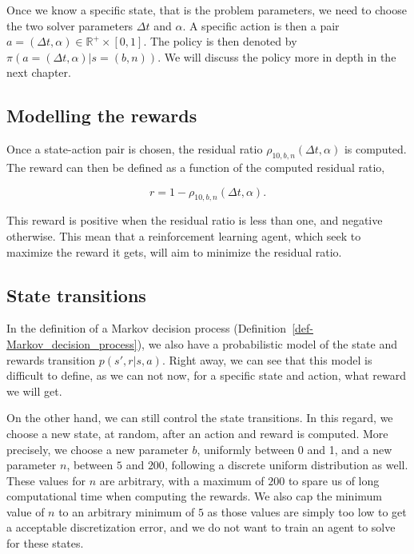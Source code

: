 \documentclass[
  letterpaper,
]{report}
\theoremstyle{definition}
\theoremstyle{plain}
\theoremstyle{definition}
\theoremstyle{remark}
\begin{document}
Once we know a specific state, that is the problem parameters, we need
to choose the two solver parameters \(\Delta t\) and \(\alpha\). A
specific action is then a pair
\(a = (\Delta t, \alpha) \in \mathbb{R^+}\times [0,1]\). The policy is
then denoted by \(\pi(a = (\Delta t, \alpha) |s = (b,n))\). We will
discuss the policy more in depth in the next chapter.

\subsection*{Modelling the rewards}\label{modelling-the-rewards}

Once a state-action pair is chosen, the residual ratio
\(\rho_{10,b,n}(\Delta t, \alpha)\) is computed. The reward can then be
defined as a function of the computed residual ratio,

\[
r = 1 - \rho_{10,b,n}(\Delta t, \alpha).
\]

This reward is positive when the residual ratio is less than one, and
negative otherwise. This mean that a reinforcement learning agent, which
seek to maximize the reward it gets, will aim to minimize the residual
ratio.

\subsection*{State transitions}\label{state-transitions-1}

In the definition of a Markov decision process
(Definition~\ref{def-Markov_decision_process}), we also have a
probabilistic model of the state and rewards transition \(p(s',r|s,a)\).
Right away, we can see that this model is difficult to define, as we can
not now, for a specific state and action, what reward we will get.

On the other hand, we can still control the state transitions. In this
regard, we choose a new state, at random, after an action and reward is
computed. More precisely, we choose a new parameter \(b\), uniformly
between 0 and 1, and a new parameter \(n\), between \(5\) and \(200\),
following a discrete uniform distribution as well. These values for
\(n\) are arbitrary, with a maximum of \(200\) to spare us of long
computational time when computing the rewards. We also cap the minimum
value of \(n\) to an arbitrary minimum of \(5\) as those values are
simply too low to get a acceptable discretization error, and we do not
want to train an agent to solve for these states.
\end{document}
